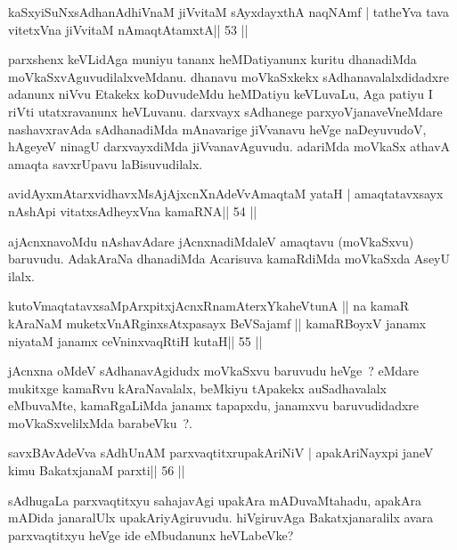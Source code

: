 \begin{shl}
kaSxyiSuNxsAdhanAdhiVnaM jiVvitaM sAyxdayxthA naqNAmf |
tatheYva tava vitetxVna jiVvitaM nAmaqtAtamxtA\hfill || 53 ||
\end{shl}

\begin{artha}
parxshenx keVLidAga muniyu tananx heMDatiyanunx kuritu dhanadiMda
moVkaSxvAguvudilalxveMdanu. dhanavu moVkaSxkekx sAdhanavalalxdidadxre
adanunx niVvu Etakekx koDuvudeMdu heMDatiyu keVLuvaLu, Aga patiyu I
riVti utatxravanunx heVLuvanu. darxvayx sAdhanege parxyoVjanaveVneMdare 
nashavxravAda sAdhanadiMda mAnavarige jiVvanavu heVge naDeyuvudoV,
hAgeyeV ninagU darxvayxdiMda jiVvanavAguvudu. adariMda moVkaSx athavA
amaqta savxrUpavu laBisuvudilalx.
\end{artha}


\begin{shl}
avidAyxmAtarxvidhavxMsAjAjxcnXnAdeVvAmaqtaM yataH |
amaqtatavxsayx nA\s\s shA\s pi vitatxsAdheyxVna kamaRNA\hfill || 54 ||
\end{shl}

\begin{artha}
ajAcnxnavoMdu nAshavAdare jAcnxnadiMdaleV amaqtavu (moVkaSxvu)
baruvudu. AdakAraNa dhanadiMda Acarisuva kamaRdiMda moVkaSxda AseyU 
ilalx.
\end{artha}

\begin{shl}
kutoV\s maqtatavxsaMpArxpitxjAcnxRnamAterxYkaheVtunA ||
na kamaR kAraNaM muketxVnARginxsAtxpasayx BeVSajamf ||
kamaRBoyxV janamx niyataM janamx ceVninxvaqRtiH kutaH\hfill || 55 ||
\end{shl}

\begin{artha}
jAcnxna oMdeV sAdhanavAgidudx moVkaSxvu baruvudu heVge~? eMdare  mukitxge kamaRvu kAraNavalalx, beMkiyu tApakekx auSadhavalalx eMbuvaMte, kamaRgaLiMda janamx tapapxdu, janamxvu baruvudidadxre moVkaSxvelilxMda barabeVku~?.
\end{artha}

\begin{shl}
savxBAvAdeVva sAdhUnAM parxvaqtitxrupakAriNiV |
apakAriNayxpi janeV kimu BakatxjanaM parxti\hfill || 56 ||
\end{shl}

\begin{artha}
sAdhugaLa parxvaqtitxyu sahajavAgi upakAra mADuvaMtahadu, apakAra mADida janaralUlx upakAriyAgiruvudu. hiVgiruvAga Bakatxjanaralilx avara parxvaqtitxyu heVge ide eMbudanunx heVLabeVke?
\end{artha}

